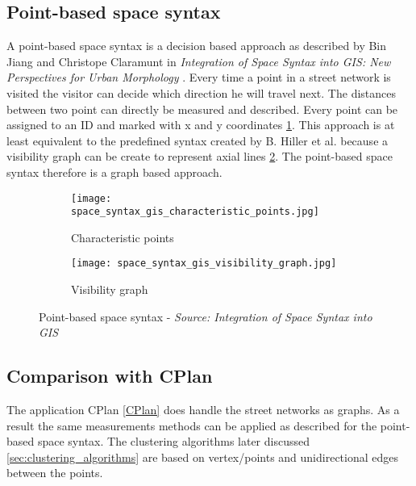 \subsection{Point-based space syntax}
A point-based space syntax is a decision based approach as described by Bin Jiang and Christope Claramunt in \textit{Integration of Space Syntax into GIS: New Perspectives for Urban Morphology} \citep{integrationSpaceSyntaxGIS:2002}. Every time a point in a street network is visited the visitor can decide which direction he will travel next. The distances between two point can directly be measured and described. Every point can be assigned to an ID and marked with x and y coordinates \ref{fig:space_syntax_gis_characteristic_points}. This approach is at least equivalent to the predefined syntax created by B. Hiller et al.\citep{spaceSyntax:1976} because a visibility graph can be create to represent axial lines \ref{fig:space_syntax_gis_visibility_graph}. The point-based space syntax therefore is a graph based approach.

\begin{figure}[h]
    \centering
    \begin{subfigure}[b]{0.4\textwidth}
        \texttt{[image: space\_syntax\_gis\_characteristic\_points.jpg]}
        \caption{Characteristic points}
        \label{fig:space_syntax_gis_characteristic_points}
    \end{subfigure}
    \quad
    \begin{subfigure}[b]{0.4\textwidth}
        \texttt{[image: space\_syntax\_gis\_visibility\_graph.jpg]}
        \caption{Visibility graph}
        \label{fig:space_syntax_gis_visibility_graph}
    \end{subfigure}
    \caption{Point-based space syntax - \textit{Source: Integration of Space Syntax into GIS \citep{integrationSpaceSyntaxGIS:2002}}}
    \label{fig:space_syntax_gis}
\end{figure}

\subsection{Comparison with CPlan}
The application CPlan \ref{CPlan} does handle the street networks as graphs. As a result the same measurements methods can be applied as described for the point-based space syntax. The clustering algorithms later discussed \ref{sec:clustering_algorithms} are based on vertex/points and unidirectional edges between the points.